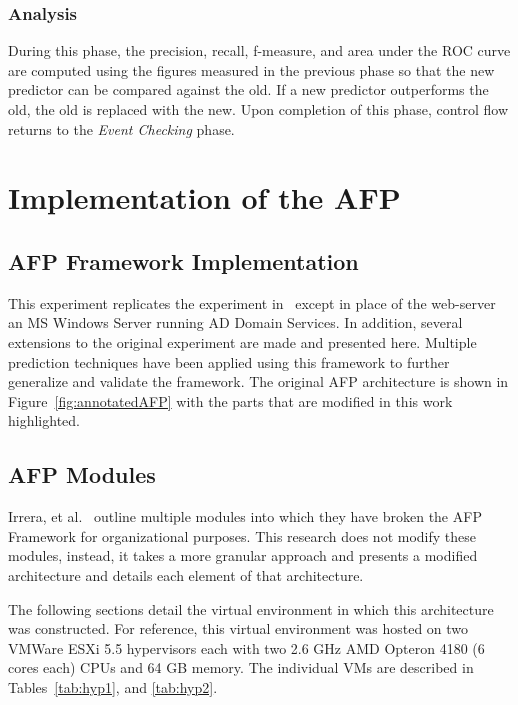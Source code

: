 \subsubsection{Analysis}
During this phase, the precision, recall, f-measure, and area under the
\ac{ROC} curve are computed using the figures measured in the previous phase so
that the new predictor can be compared against the old.  If a new predictor
outperforms the old, the old is replaced with the new.  Upon completion of this
phase, control flow returns to the \emph{Event Checking} phase.

\section{Implementation of the \ac{AFP}} \label{sec:implementation}
\subsection{\ac{AFP} Framework Implementation}
This experiment replicates the experiment in~\cite{irrera2015} except in place
of the web-server an \ac{MS} Windows Server running \ac{AD} Domain Services.
In addition, several extensions to the original experiment are made and
presented here.  Multiple prediction techniques have been applied using this
framework to further generalize and validate the framework.  The original
\ac{AFP} architecture is shown in Figure~\ref{fig:annotatedAFP} with the parts
that are modified in this work highlighted.  

\subsection{\ac{AFP} Modules}
Irrera, et al.~\cite{irrera2015} outline multiple modules into which they have
broken the \ac{AFP} Framework for organizational purposes.  This research does
not modify these modules, instead, it takes a more granular approach and
presents a modified architecture and details each element of that architecture.

\figannotatedAFP  

The following sections detail the virtual environment in which this
architecture was constructed.  For reference, this virtual environment was
hosted on two VMWare ESXi 5.5 hypervisors each with two 2.6 \ac{GHz} AMD
Opteron 4180 (6 cores each) \ac{CPU}s and 64 \ac{GB} memory.  The individual
\ac{VM}s are described in Tables~\ref{tab:hyp1}, and \ref{tab:hyp2}.

\tabHypervisorOne
\tabHypervisorTwo

